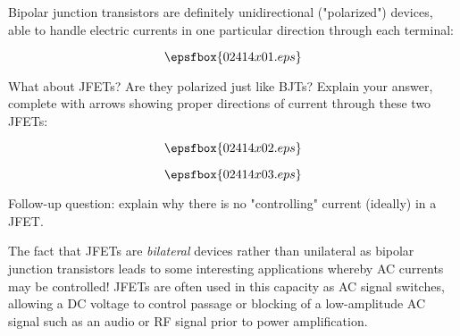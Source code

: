 

Bipolar junction transistors are definitely unidirectional ("polarized") devices, able to handle electric currents in one particular direction through each terminal:

$$\epsfbox{02414x01.eps}$$

What about JFETs?  Are they polarized just like BJTs?  Explain your answer, complete with arrows showing proper directions of current through these two JFETs:

$$\epsfbox{02414x02.eps}$$







$$\epsfbox{02414x03.eps}$$

\vskip 10pt

Follow-up question: explain why there is no "controlling" current (ideally) in a JFET.







The fact that JFETs are {\it bilateral} devices rather than unilateral as bipolar junction transistors leads to some interesting applications whereby AC currents may be controlled!  JFETs are often used in this capacity as AC signal switches, allowing a DC voltage to control passage or blocking of a low-amplitude AC signal such as an audio or RF signal prior to power amplification.




